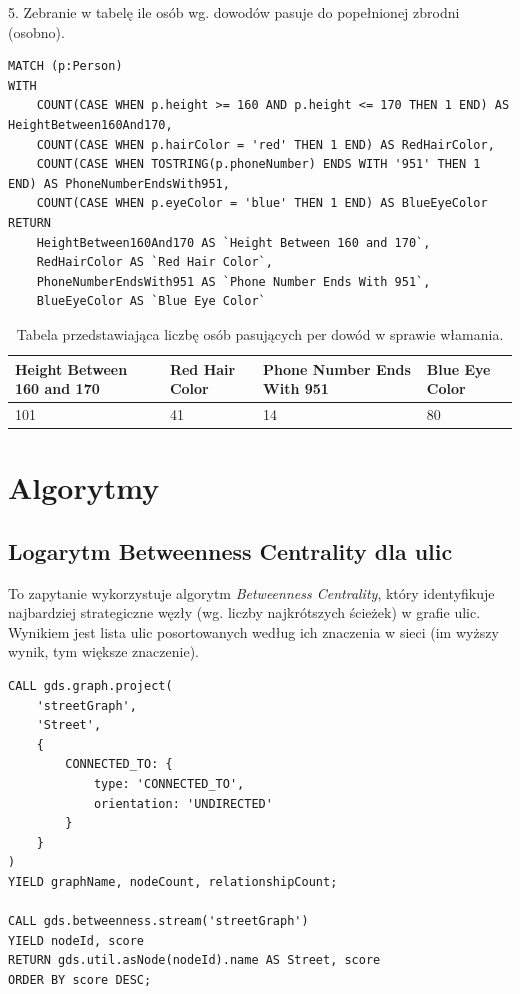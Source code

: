 \documentclass[a4paper,12pt]{article}
\begin{document}
5. Zebranie w tabelę ile osób wg. dowodów pasuje do popełnionej zbrodni (osobno).

\begin{center}
\begin{minipage}{0.8\linewidth}
\begin{lstlisting}[language=Cypher, basicstyle=\small, breaklines=true]
MATCH (p:Person)
WITH
    COUNT(CASE WHEN p.height >= 160 AND p.height <= 170 THEN 1 END) AS HeightBetween160And170,
    COUNT(CASE WHEN p.hairColor = 'red' THEN 1 END) AS RedHairColor,
    COUNT(CASE WHEN TOSTRING(p.phoneNumber) ENDS WITH '951' THEN 1 END) AS PhoneNumberEndsWith951,
    COUNT(CASE WHEN p.eyeColor = 'blue' THEN 1 END) AS BlueEyeColor
RETURN 
    HeightBetween160And170 AS `Height Between 160 and 170`, 
    RedHairColor AS `Red Hair Color`, 
    PhoneNumberEndsWith951 AS `Phone Number Ends With 951`,
    BlueEyeColor AS `Blue Eye Color`
\end{lstlisting}
\end{minipage}
\end{center}

\begin{table}[h!]
\centering
\begin{tabular}{|p{4cm}|p{4cm}|p{4cm}|p{4cm}|}
\hline
\textbf{Height Between 160 and 170} & \textbf{Red Hair Color} & \textbf{Phone Number Ends With 951} & \textbf{Blue Eye Color} \\
\hline
101 & 41 & 14 & 80 \\
\hline
\end{tabular}
\caption{Tabela przedstawiająca liczbę osób pasujących per dowód w sprawie włamania.}
\label{tab:criteria_counts}
\end{table}

\newpage

\section{Algorytmy}

\subsection*{Logarytm Betweenness Centrality dla ulic}
To zapytanie wykorzystuje algorytm \textit{Betweenness Centrality}, który identyfikuje najbardziej strategiczne węzły (wg. liczby najkrótszych ścieżek) w grafie ulic. Wynikiem jest lista ulic posortowanych według ich znaczenia w sieci (im wyższy wynik, tym większe znaczenie).
\begin{verbatim}
CALL gds.graph.project(
    'streetGraph',
    'Street',
    {
        CONNECTED_TO: {
            type: 'CONNECTED_TO',
            orientation: 'UNDIRECTED'
        }
    }
)
YIELD graphName, nodeCount, relationshipCount;

CALL gds.betweenness.stream('streetGraph') 
YIELD nodeId, score
RETURN gds.util.asNode(nodeId).name AS Street, score
ORDER BY score DESC;
\end{verbatim}
\end{document}
